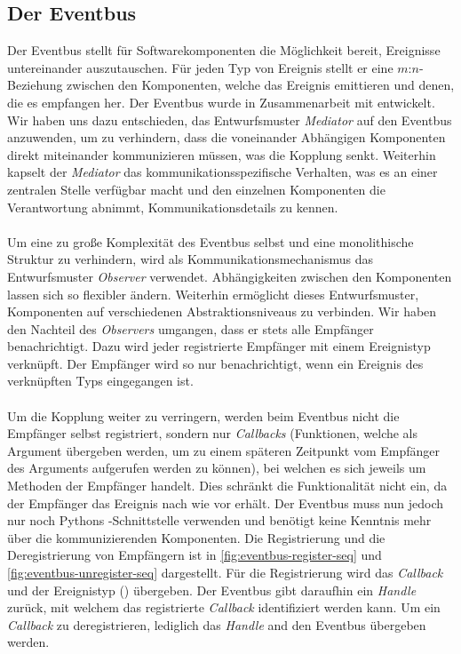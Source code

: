 \subsection{Der Eventbus}

Der Eventbus stellt für Softwarekomponenten die Möglichkeit bereit, Ereignisse untereinander auszutauschen. Für jeden Typ von Ereignis stellt er eine $m$:$n$-Beziehung zwischen den Komponenten, welche das Ereignis emittieren und denen, die es empfangen her. Der Eventbus wurde in Zusammenarbeit mit \citeauthor{persitzky_fehlerinjektion_2023} entwickelt. Wir haben uns dazu entschieden, das Entwurfsmuster \emph{Mediator} auf den Eventbus anzuwenden, um zu verhindern, dass die voneinander Abhängigen Komponenten direkt miteinander kommunizieren müssen, was die Kopplung senkt. Weiterhin kapselt der \emph{Mediator} das kommunikationsspezifische Verhalten, was es an einer zentralen Stelle verfügbar macht und den einzelnen Komponenten die Verantwortung abnimmt, Kommunikationsdetails zu kennen.\\
\\
Um eine zu große Komplexität des Eventbus selbst und eine monolithische Struktur zu verhindern, wird als Kommunikationsmechanismus das Entwurfsmuster \emph{Observer} verwendet. Abhängigkeiten zwischen den Komponenten lassen sich so flexibler ändern. Weiterhin ermöglicht dieses Entwurfsmuster, Komponenten auf verschiedenen Abstraktionsniveaus zu verbinden. Wir haben den Nachteil des \emph{Observers} umgangen, dass er stets alle Empfänger benachrichtigt. Dazu wird jeder registrierte Empfänger mit einem Ereignistyp verknüpft. Der Empfänger wird so nur benachrichtigt, wenn ein Ereignis des verknüpften Typs eingegangen ist.\\
\\
Um die Kopplung weiter zu verringern, werden beim Eventbus nicht die Empfänger selbst registriert, sondern nur \emph{Callbacks} (Funktionen, welche als Argument übergeben werden, um zu einem späteren Zeitpunkt vom Empfänger des Arguments aufgerufen werden zu können), bei welchen es sich jeweils um Methoden der Empfänger handelt. Dies schränkt die Funktionalität nicht ein, da der Empfänger das Ereignis nach wie vor erhält. Der Eventbus muss nun jedoch nur noch Pythons -Schnittstelle verwenden und benötigt keine Kenntnis mehr über die kommunizierenden Komponenten. Die Registrierung und die Deregistrierung von Empfängern ist in \autoref{fig:eventbus-register-seq} und \autoref{fig:eventbus-unregister-seq} dargestellt. Für die Registrierung wird das \emph{Callback} und der Ereignistyp () übergeben. Der Eventbus gibt daraufhin ein \emph{Handle} zurück, mit welchem das registrierte \emph{Callback} identifiziert werden kann. Um ein \emph{Callback} zu deregistrieren, lediglich das \emph{Handle} and den Eventbus übergeben werden.

